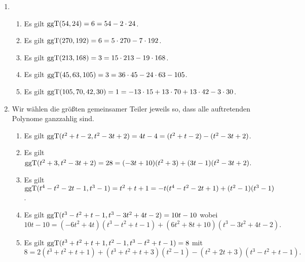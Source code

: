 \begin{solution}
  \begin{enumerate}
    \item
      \begin{enumerate}
        \item
          Es gilt $\operatorname{ggT}(54, 24) = 6 = 54 - 2 \cdot 24$.
        \item
          Es gilt $\operatorname{ggT}(270, 192) = 6 = 5 \cdot 270 - 7 \cdot 192$.
        \item
          Es gilt $\operatorname{ggT}(213, 168) = 3 = 15 \cdot 213 - 19 \cdot 168$.
        \item
          Es gilt $\operatorname{ggT}(45,63,105) = 3 = 36 \cdot 45 - 24 \cdot 63 - 105$.
        \item
          Es gilt $\operatorname{ggT}(105, 70, 42, 30) = 1 = -13 \cdot 15 + 13 \cdot 70 + 13 \cdot 42 - 3 \cdot 30$.
      \end{enumerate}
    \item
      Wir wählen die größten gemeinsamer Teiler jeweils so, dass alle auftretenden Polynome ganzzahlig sind.
      \begin{enumerate}
        \item
          Es gilt $\operatorname{ggT}(t^2 + t - 2, t^2 - 3t + 2) = 4t-4 = (t^2 + t - 2) - (t^2 - 3t + 2)$.
        \item
          Es gilt $\operatorname{ggT}(t^2 + 3, t^2 - 3t + 2) = 28 = (-3t + 10)(t^2 + 3) + (3t - 1)(t^2 - 3t + 2)$.
        \item
          Es gilt $\operatorname{ggT}(t^4 - t^2 - 2 t - 1, t^3 - 1) = t^2 + t + 1 = -t(t^4-t^2-2t+1) + (t^2-1)(t^3-1)$.
        \item
          Es gilt $\operatorname{ggT}(t^3 - t^2 + t - 1, t^3 - 3 t^2 + 4 t - 2) = 10t-10$ wobei
          \[
            10t-10 = (-6 t^2 + 4 t)(t^3 - t^2 + t - 1) + (6 t^2 + 8 t + 10)(t^3 - 3 t^2 + 4 t - 2).
          \]
        \item
          Es gilt $\operatorname{ggT}(t^3 + t^2 + t + 1, t^2 - 1, t^3 - t^2 + t - 1) = 8$ mit
          \[
              8 = 2(t^3 + t^2 + t + 1) + (t^3 + t^2 + t + 3)(t^2 - 1) - (t^2 + 2t + 3)(t^3 - t^2 + t - 1).
          \]
      \end{enumerate}
  \end{enumerate}
\end{solution}


